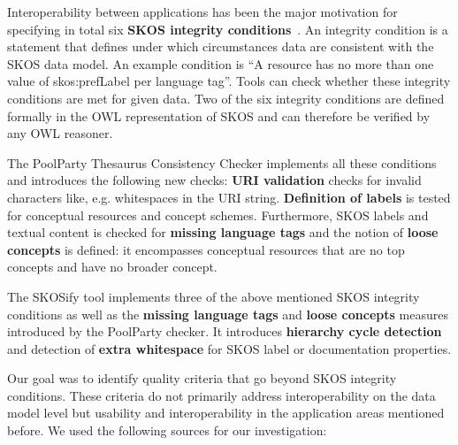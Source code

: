 

Interoperability between applications has been the major motivation for specifying in total six \textbf{SKOS integrity conditions}~\cite{Miles2005}. An integrity condition is a statement that defines under which circumstances data are consistent with the SKOS data model. An example condition is ``A resource has no more than one value of skos:prefLabel per language tag''. Tools can check whether these integrity conditions are met for given data. Two of the six integrity conditions are defined formally in the OWL representation of SKOS and can therefore be verified by any OWL reasoner. 

The PoolParty Thesaurus Consistency Checker implements all these conditions and introduces the following new checks: \textbf{URI validation} checks for invalid characters like, e.g. whitespaces in the URI string. \textbf{Definition of labels} is tested for conceptual resources and concept schemes. Furthermore, SKOS labels and textual content is checked for \textbf{missing language tags} and the notion of \textbf{loose concepts} is defined: it encompasses conceptual resources that are no top concepts and have no broader concept.

The SKOSify tool implements three of the above mentioned SKOS integrity conditions as well as the \textbf{missing language tags} and \textbf{loose concepts} measures introduced by the PoolParty checker. It introduces \textbf{hierarchy cycle detection} and detection of \textbf{extra whitespace} for SKOS label or documentation properties.




Our goal was to identify quality criteria that go beyond SKOS integrity conditions. These criteria do not primarily address interoperability on the data model level but usability and interoperability in the application areas mentioned before. We used the following sources for our investigation:

